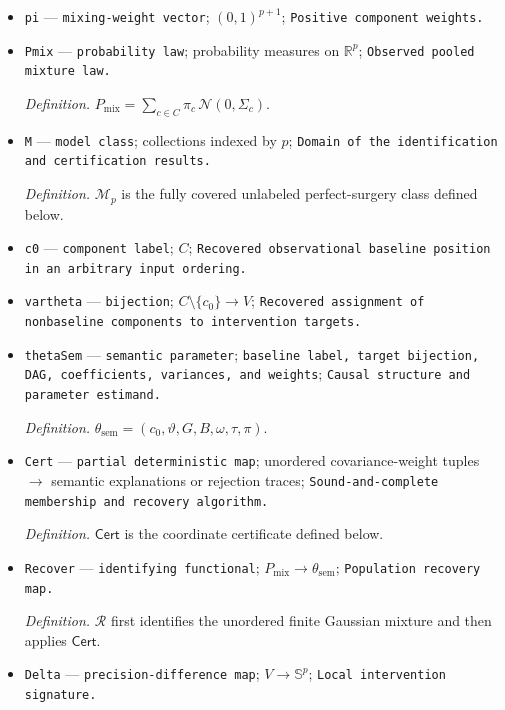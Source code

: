 \documentclass{article}
\begin{document}
\begin{itemize}
  \item \texttt{pi} --- \texttt{mixing-\allowbreak{}weight vector}; \((0,1)^{p+1}\); \texttt{Positive component weights.}
  \item \texttt{Pmix} --- \texttt{probability law}; probability measures on \(\mathbb R^p\); \texttt{Observed pooled mixture law.}
  \par\smallskip\noindent\emph{Definition.} \(P_{\mathrm{mix}}=\sum_{c\in C}\pi_c\,\mathcal N(0,\Sigma_c)\).
  \item \texttt{M} --- \texttt{model class}; collections indexed by \(p\); \texttt{Domain of the identification and certification results.}
  \par\smallskip\noindent\emph{Definition.} \(\mathcal M_p\) is the fully covered unlabeled perfect-surgery class defined below.
  \item \texttt{c0} --- \texttt{component label}; \(C\); \texttt{Recovered observational baseline position in an arbitrary input ordering.}
  \item \texttt{vartheta} --- \texttt{bijection}; \(C\setminus\{c_0\}\to V\); \texttt{Recovered assignment of nonbaseline components to intervention targets.}
  \item \texttt{thetaSem} --- \texttt{semantic parameter}; \texttt{baseline label,\allowbreak{} target bijection,\allowbreak{} DAG,\allowbreak{} coefficients,\allowbreak{} variances,\allowbreak{} and weights}; \texttt{Causal structure and parameter estimand.}
  \par\smallskip\noindent\emph{Definition.} \(\theta_{\mathrm{sem}}=(c_0,\vartheta,G,B,\omega,\tau,\pi)\).
  \item \texttt{Cert} --- \texttt{partial deterministic map}; unordered covariance-weight tuples \(\to\) semantic explanations or rejection traces; \texttt{Sound-\allowbreak{}and-\allowbreak{}complete membership and recovery algorithm.}
  \par\smallskip\noindent\emph{Definition.} \(\mathsf{Cert}\) is the coordinate certificate defined below.
  \item \texttt{Recover} --- \texttt{identifying functional}; \(P_{\mathrm{mix}}\to\theta_{\mathrm{sem}}\); \texttt{Population recovery map.}
  \par\smallskip\noindent\emph{Definition.} \(\mathcal R\) first identifies the unordered finite Gaussian mixture and then applies \(\mathsf{Cert}\).
  \item \texttt{Delta} --- \texttt{precision-\allowbreak{}difference map}; \(V\to\mathbb S^p\); \texttt{Local intervention signature.}

\end{itemize}
\end{document}
